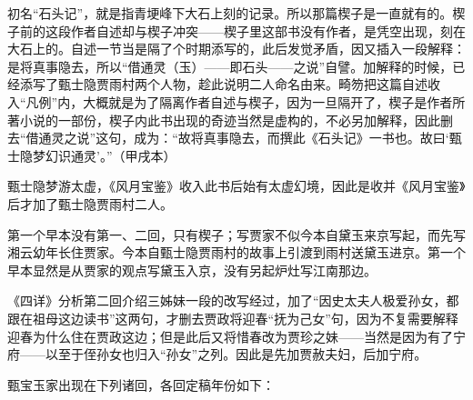 \par 初名“石头记”，就是指青埂峰下大石上刻的记录。所以那篇楔子是一直就有的。楔子前的这段作者自述却与楔子冲突——楔子里这部书没有作者，是凭空出现，刻在大石上的。自述一节当是隔了个时期添写的，此后发觉矛盾，因又插入一段解释：是将真事隐去，所以“借通灵（玉）——即石头——之说”自譬。加解释的时候，已经添写了甄士隐贾雨村两个人物，趁此说明二人命名由来。畸笏把这篇自述收入“凡例”内，大概就是为了隔离作者自述与楔子，因为一旦隔开了，楔子是作者所著小说的一部份，楔子内此书出现的奇迹当然是虚构的，不必另加解释，因此删去“借通灵之说”这句，成为：“故将真事隐去，而撰此《石头记》一书也。故曰‘甄士隐梦幻识通灵’。”（甲戌本）
\par 甄士隐梦游太虚，《风月宝鉴》收入此书后始有太虚幻境，因此是收并《风月宝鉴》后才加了甄士隐贾雨村二人。
\par 第一个早本没有第一、二回，只有楔子；写贾家不似今本自黛玉来京写起，而先写湘云幼年长住贾家。今本自甄士隐贾雨村的故事上引渡到雨村送黛玉进京。第一个早本显然是从贾家的观点写黛玉入京，没有另起炉灶写江南那边。
\par 《四详》分析第二回介绍三姊妹一段的改写经过，加了“因史太夫人极爱孙女，都跟在祖母这边读书”这两句，才删去贾政将迎春“抚为己女”句，因为不复需要解释迎春为什么住在贾政这边；但是此后又将惜春改为贾珍之妹——当然是因为有了宁府——以至于侄孙女也归入“孙女”之列。因此是先加贾赦夫妇，后加宁府。
\par 甄宝玉家出现在下列诸回，各回定稿年份如下：
